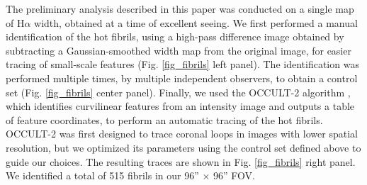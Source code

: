 \documentclass{iau}
\begin{document}
The preliminary analysis described in this paper was conducted on a single map of H$\alpha$ width, obtained at a time of excellent seeing. We first performed a manual identification of the hot fibrils, using a high-pass difference image obtained by subtracting a Gaussian-smoothed width map from the original image, for easier tracing of small-scale features (Fig. \ref{fig_fibrils} left panel). The identification was performed multiple times, by multiple independent observers, to obtain 
a control set (Fig. \ref{fig_fibrils} center panel). Finally, we used the OCCULT-2 algorithm \citep{2013Entrp..15.3007A}, which identifies curvilinear features from an intensity image and outputs a table of feature coordinates, to perform an automatic tracing of the hot fibrils. OCCULT-2 was first designed to trace coronal loops in images with lower spatial resolution, but we optimized its parameters using the control set defined above to guide our choices. The resulting traces are shown in 
Fig. \ref{fig_fibrils} right panel. We identified a total of 515 fibrils in our 96'' $\times$ 96'' FOV.
\end{document}
